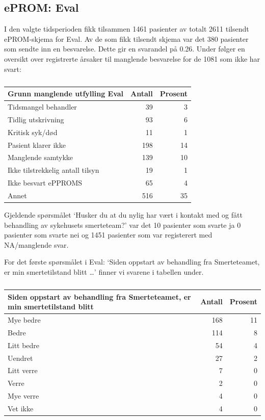 \documentclass[
]{article}
\begin{document}
\hypertarget{eprom-eval}{%
\subsection{ePROM: Eval}\label{eprom-eval}}

I den valgte tidsperioden fikk tilsammen 1461 pasienter av totalt 2611
tilsendt ePROM-skjema for Eval. Av de som fikk tilsendt skjema var det
380 pasienter som sendte inn en besvarelse. Dette gir en svarandel på
0.26. Under følger en oversikt over registrerte årsaker til manglende
besvarelse for de 1081 som ikke har svart:

\begin{table}

\caption{\label{tab:evalu}}
\centering
\begin{tabular}[t]{l|r|r}
\hline
Grunn manglende utfylling Eval & Antall  & Prosent\\
\hline
Tidsmangel behandler & 39 & 3\\
\hline
Tidlig utskrivning & 93 & 6\\
\hline
Kritisk syk/død & 11 & 1\\
\hline
Pasient klarer ikke & 198 & 14\\
\hline
Manglende samtykke & 139 & 10\\
\hline
Ikke tilstrekkelig antall tilsyn & 19 & 1\\
\hline
Ikke besvart ePPROMS & 65 & 4\\
\hline
Annet & 516 & 35\\
\hline
\end{tabular}
\end{table}

Gjeldende spørsmålet `Husker du at du nylig har vært i kontakt med og
fått behandling av sykehusets smerteteam?' var det 10 pasienter som
svarte ja 0 pasienter som svarte nei og 1451 pasienter som var
registerert med NA/manglende svar.

For det første spørsmålet i Eval: `Siden oppstart av behandling fra
Smerteteamet, er min smertetilstand blitt \ldots{}' finner vi svarene i
tabellen under.

\begin{table}

\caption{\label{tab:evalu}}
\centering
\begin{tabular}[t]{l|r|r}
\hline
Siden oppstart av behandling fra Smerteteamet, er min smertetilstand blitt & Antall  & Prosent\\
\hline
Mye bedre & 168 & 11\\
\hline
Bedre & 114 & 8\\
\hline
Litt bedre & 54 & 4\\
\hline
Uendret & 27 & 2\\
\hline
Litt verre & 7 & 0\\
\hline
Verre & 2 & 0\\
\hline
Mye verre & 4 & 0\\
\hline
Vet ikke & 4 & 0\\
\hline
\end{tabular}
\end{table}
\end{document}
